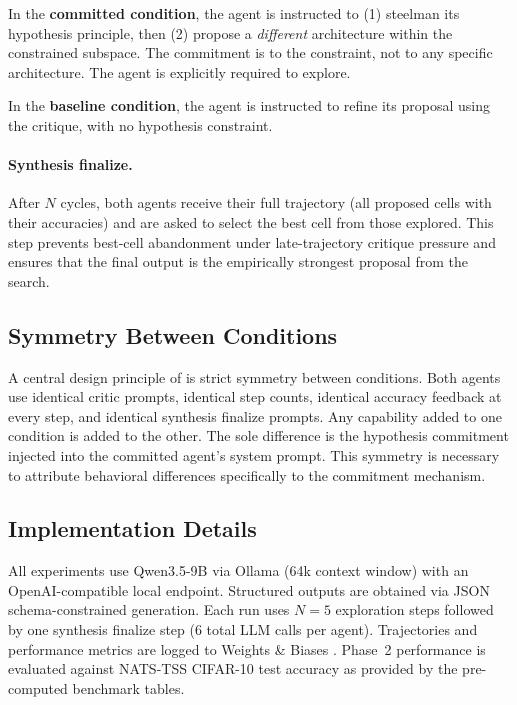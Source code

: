 In the \textbf{committed condition}, the agent is instructed to (1) steelman its
hypothesis principle, then (2) propose a \emph{different} architecture within the
constrained subspace. The commitment is to the constraint, not to any specific
architecture. The agent is explicitly required to explore.

In the \textbf{baseline condition}, the agent is instructed to refine its
proposal using the critique, with no hypothesis constraint.

\paragraph{Synthesis finalize.} After $N$ cycles, both agents receive their full
trajectory (all proposed cells with their accuracies) and are asked to select the
best cell from those explored. This step prevents best-cell abandonment under
late-trajectory critique pressure and ensures that the final output is the
empirically strongest proposal from the search.

\subsection{Symmetry Between Conditions}
\label{sec:symmetry}

A central design principle of \haas{} is strict symmetry between conditions.
Both agents use identical critic prompts, identical step counts, identical
accuracy feedback at every step, and identical synthesis finalize prompts. Any
capability added to one condition is added to the other. The sole difference is
the hypothesis commitment injected into the committed agent's system prompt. This
symmetry is necessary to attribute behavioral differences specifically to the
commitment mechanism.

\subsection{Implementation Details}
\label{sec:implementation}

All experiments use Qwen3.5-9B \citep{qwen2025qwen35} via Ollama (64k context window)
with an OpenAI-compatible local endpoint. Structured outputs are obtained via JSON
schema-constrained generation. Each run uses $N=5$ exploration steps followed by
one synthesis finalize step (6 total LLM calls per agent). Trajectories and
performance metrics are logged to Weights \& Biases \citep{wandb}. Phase~2
performance is evaluated against NATS-TSS CIFAR-10 test accuracy as provided
by the pre-computed benchmark tables.

